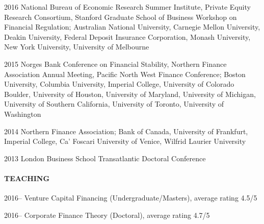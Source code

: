 \documentclass[11pt]{article}
\begin{document}
\begin{datelist}
    \item[2016] National Bureau of Economic Research Summer Institute, Private Equity Research Consortium, Stanford Graduate School of Business Workshop on Financial Regulation; Australian National University, Carnegie Mellon University, Deakin University, Federal Deposit Insurance Corporation, Monash University, New York University, University of Melbourne

    \item[2015] Norges Bank Conference on Financial Stability, Northern Finance Association Annual Meeting, Pacific North West Finance Conference; Boston University, Columbia University, Imperial College, University of Colorado Boulder, University of Houston, University of Maryland, University of Michigan, University of Southern California, University of Toronto, University of Washington

    \item[2014] Northern Finance Association; Bank of Canada, University of Frankfurt, Imperial College, Ca' Foscari University of Venice, Wilfrid Laurier University

    \item[2013] London Business School Transatlantic Doctoral Conference
\end{datelist}

\paragraph{TEACHING}
\begin{datelist}
    \item[2016--] Venture Capital Financing (Undergraduate/Masters), average rating 4.5/5
    \item[2016--] Corporate Finance Theory (Doctoral), average rating 4.7/5
\end{datelist}
\end{document}
